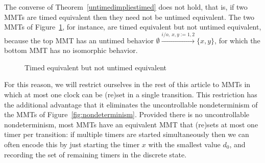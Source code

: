 The converse of Theorem~\ref{untimedimpliestimed} does not hold, that is,
if two MMTs are timed equivalent then they need not be untimed equivalent. 
The two MMTs of Figure~\ref{fig:twoequivalentone}, for instance,
are timed equivalent but not untimed equivalent,
because the top MMT has an untimed behavior
$ \emptyset \xrightarrow{i/o,~ x, y:=1,2 } \{ x, y \}$, for which the bottom MMT has no isomorphic behavior.
\begin{figure}
\begin{center}

\vspace{1 em}
\caption{Timed equivalent but not untimed equivalent}
\label{fig:twoequivalentone}
\end{center}
\end{figure}
For this reason, we will restrict ourselves in the rest of this article to MMTs in which at most
one clock can be (re)set in a single transition. This restriction has the additional advantage that it
eliminates the uncontrollable nondeterminism
of the MMTs of Figure~\ref{fig:nondeterminism}.
Provided there is no uncontrollable nondeterminism, most MMTs
have an equivalent MMT that (re)sets at most one timer per transition:
if multiple timers are started simultaneously then we can often encode this by just
starting the timer $x$ with the smallest value $d_0$, and recording the set of remaining timers in the discrete state.

